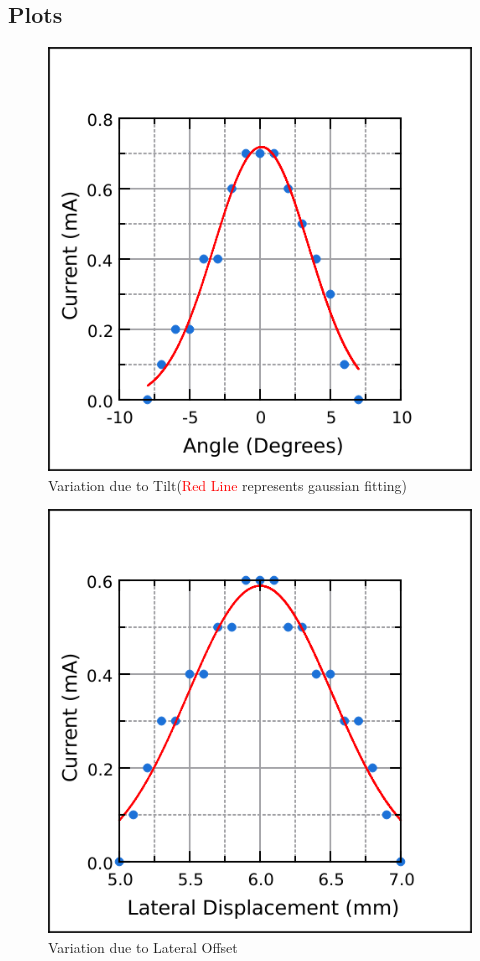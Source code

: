 \subsection{Plots}
\begin{figure}[h]
        \centering
        \includegraphics[width = 10 cm]{chapters/TILT.png}
        \caption{Variation due to Tilt(\textcolor{red}{Red Line} represents gaussian fitting)}
    \end{figure}
    \begin{figure}[h]
        \centering
        \includegraphics[width = 10 cm]{chapters/LO.png}
        \caption{Variation due to Lateral Offset}
    \end{figure}
